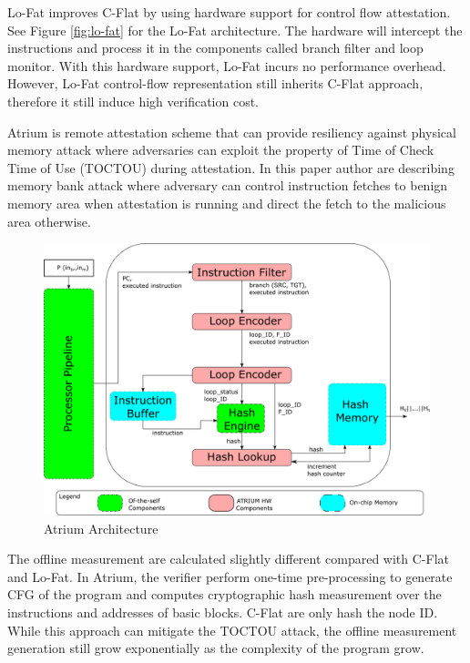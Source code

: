 Lo-Fat\cite{dessoukyLOFATLowOverheadControl2017} improves C-Flat by using
hardware support for control flow attestation. See Figure \ref{fig:lo-fat} for
the Lo-Fat architecture. The hardware will intercept the instructions and
process it in the components called branch filter and loop monitor. With this
hardware support, Lo-Fat incurs no performance overhead. However, Lo-Fat
control-flow representation still inherits C-Flat approach, therefore it still
induce high verification cost.

Atrium \cite{zeitouniATRIUMRuntimeAttestation2017} is remote attestation scheme
that can provide resiliency against physical memory attack where adversaries can
exploit the property of Time of Check Time of Use (TOCTOU) during attestation.
In this paper author are describing memory bank attack where adversary can
control instruction fetches to benign memory area when attestation is running
and direct the fetch to the malicious area otherwise.

\begin{figure}[htbp]
\centerline{\includegraphics[scale=0.5]{Figures/01/atrium-overview.png}}
\caption{Atrium Architecture}
\label{fig:atrium}
\end{figure}

The offline measurement are calculated slightly different compared with C-Flat
and Lo-Fat. In Atrium, the verifier perform one-time pre-processing to generate
CFG of the program and computes cryptographic hash measurement over the
instructions and addresses of basic blocks. C-Flat are only hash the node ID.
While this approach can mitigate the TOCTOU attack, the offline measurement
generation still grow exponentially as the complexity of the program grow. 

